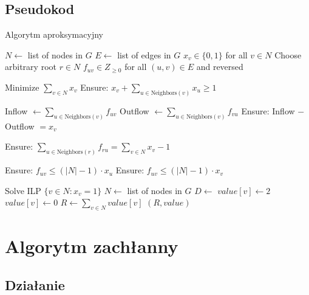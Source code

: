 \subsection{Pseudokod}
\begin{algorithm}
    \caption*{Algorytm aproksymacyjny}
    \begin{algorithmic}[1]
        \State $N \gets$ list of nodes in $G$
        \State $E \gets$ list of edges in $G$
        \State $x_v \in \{0,1\}$ for all $v \in N$
        \State Choose arbitrary root $r \in N$
        \State $f_{uv} \in {Z}_{\geq 0}$ for all $(u,v) \in E$ and reversed
    
        \State Minimize $\sum_{v \in N} x_v$
            \State Ensure: $x_v + \sum_{u \in \text{Neighbors}(v)} x_u \geq 1$ 
        \EndFor
    
            \State Inflow $\gets \sum_{u \in \text{Neighbors}(v)} f_{uv}$
            \State Outflow $\gets \sum_{u \in \text{Neighbors}(v)} f_{vu}$
            \State Ensure: Inflow $-$ Outflow $= x_v$ 
        \EndFor
    
        \State Ensure: $\sum_{u \in \text{Neighbors}(r)} f_{ru} = \sum_{v \in N} x_v - 1$ 
    
            \State Ensure: $f_{uv} \leq (|N|-1) \cdot x_u$
            \State Ensure: $f_{uv} \leq (|N|-1) \cdot x_v$ 
        \EndFor
    
        \State Solve ILP
        \State \Return $\{v \in N : x_v = 1\}$
    \EndFunction
        \State $N \gets$ list of nodes in $G$
        \State $D \gets$ 
                \State $value[v] \gets 2$
            \Else
                \State $value[v] \gets 0$
            \EndIf
        \EndFor
        \State $R \gets \sum_{v \in N} value[v]$
        \State \Return $(R, value)$
    \EndFunction
    \end{algorithmic}
    \end{algorithm}

    \section{Algorytm zachłanny}
    \subsection{Działanie}
    
